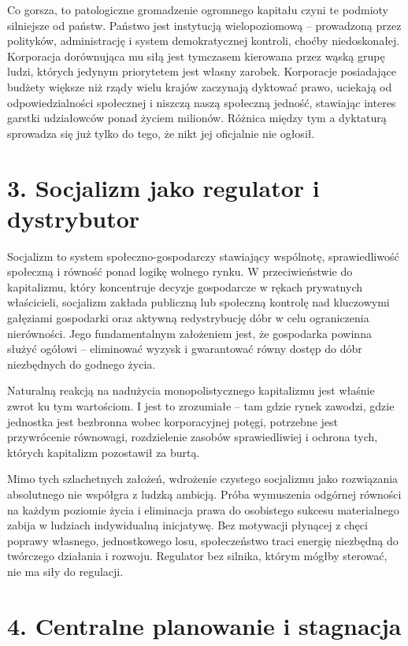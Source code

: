 \documentclass[12pt,a4paper]{article}
\begin{document}
Co gorsza, to patologiczne gromadzenie ogromnego kapitału czyni te podmioty silniejsze od państw. Państwo jest instytucją wielopoziomową -- prowadzoną przez polityków, administrację i system demokratycznej kontroli, choćby niedoskonałej. Korporacja dorównująca mu siłą jest tymczasem kierowana przez wąską grupę ludzi, których jedynym priorytetem jest własny zarobek. Korporacje posiadające budżety większe niż rządy wielu krajów zaczynają dyktować prawo, uciekają od odpowiedzialności społecznej i niszczą naszą społeczną jedność, stawiając interes garstki udziałowców ponad życiem milionów. Różnica między tym a dyktaturą sprowadza się już tylko do tego, że nikt jej oficjalnie nie ogłosił.

\section*{3. Socjalizm jako regulator i dystrybutor}

Socjalizm to system społeczno-gospodarczy stawiający wspólnotę, sprawiedliwość społeczną i równość ponad logikę wolnego rynku. W przeciwieństwie do kapitalizmu, który koncentruje decyzje gospodarcze w rękach prywatnych właścicieli, socjalizm zakłada publiczną lub społeczną kontrolę nad kluczowymi gałęziami gospodarki oraz aktywną redystrybucję dóbr w celu ograniczenia nierówności. Jego fundamentalnym założeniem jest, że gospodarka powinna służyć ogółowi -- eliminować wyzysk i gwarantować równy dostęp do dóbr niezbędnych do godnego życia.

Naturalną reakcją na nadużycia monopolistycznego kapitalizmu jest właśnie zwrot ku tym wartościom. I jest to zrozumiałe -- tam gdzie rynek zawodzi, gdzie jednostka jest bezbronna wobec korporacyjnej potęgi, potrzebne jest przywrócenie równowagi, rozdzielenie zasobów sprawiedliwiej i ochrona tych, których kapitalizm pozostawił za burtą.

Mimo tych szlachetnych założeń, wdrożenie czystego socjalizmu jako rozwiązania absolutnego nie współgra z ludzką ambicją. Próba wymuszenia odgórnej równości na każdym poziomie życia i eliminacja prawa do osobistego sukcesu materialnego zabija w ludziach indywidualną inicjatywę. Bez motywacji płynącej z chęci poprawy własnego, jednostkowego losu, społeczeństwo traci energię niezbędną do twórczego działania i rozwoju. Regulator bez silnika, którym mógłby sterować, nie ma siły do regulacji.

\section*{4. Centralne planowanie i stagnacja}
\end{document}
